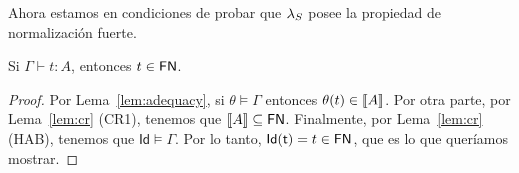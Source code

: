 Ahora estamos en condiciones de probar que \( \lambda_S \) posee la propiedad de normalización fuerte.

\begin{theorem}
  Si \( \Gamma \vdash t : A \), entonces \( t \in \mathsf{FN} \).
\end{theorem}

\begin{proof}
  Por Lema~\ref{lem:adequacy}, si \( \theta \models \Gamma \) entonces \( \theta(t) \in \llbracket A\rrbracket \). Por otra parte, por Lema~\ref{lem:cr} (CR1), tenemos que \( \llbracket A\rrbracket \subseteq \mathsf{FN} \). Finalmente, por Lema~\ref{lem:cr} (HAB), tenemos que \( \mathsf{Id} \models \Gamma \).
  Por lo tanto, \( \mathsf{Id(t)} = t \in \mathsf{FN} \), que es lo que queríamos mostrar.
\end{proof}
